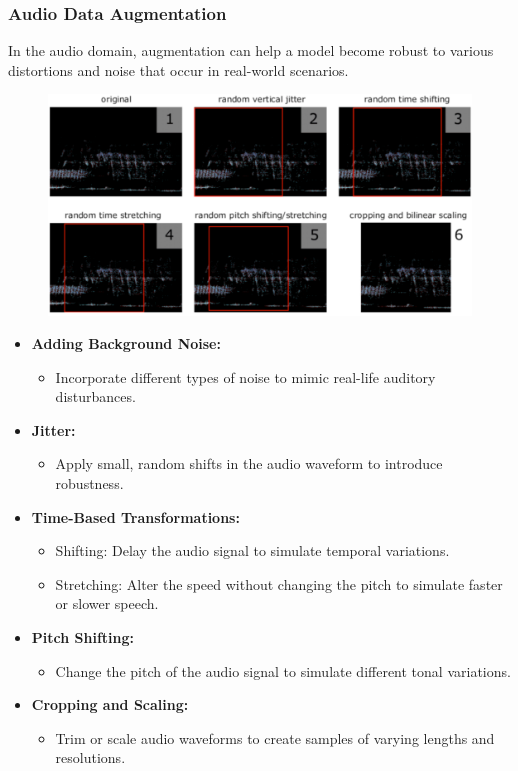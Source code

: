 \subsubsection{Audio Data Augmentation}
In the audio domain, augmentation can help a model become robust to various distortions and noise that occur in real-world scenarios.
\begin{figure}[H]
    \centering
    \includegraphics[width=0.8\linewidth]{img/audio_aug.png}
    
    
\end{figure}
\begin{itemize}
    \item \textbf{Adding Background Noise:}
    \begin{itemize}
        \item Incorporate different types of noise to mimic real-life auditory disturbances.
    \end{itemize}
    
    \item \textbf{Jitter:}
    \begin{itemize}
        \item Apply small, random shifts in the audio waveform to introduce robustness.
    \end{itemize}
    
    \item \textbf{Time-Based Transformations:}
    \begin{itemize}
        \item Shifting: Delay the audio signal to simulate temporal variations.
        \item Stretching: Alter the speed without changing the pitch to simulate faster or slower speech.
    \end{itemize}
    
    \item \textbf{Pitch Shifting:}
    \begin{itemize}
        \item Change the pitch of the audio signal to simulate different tonal variations.
    \end{itemize}
    
    \item \textbf{Cropping and Scaling:}
    \begin{itemize}
        \item Trim or scale audio waveforms to create samples of varying lengths and resolutions.
    \end{itemize}
\end{itemize}

